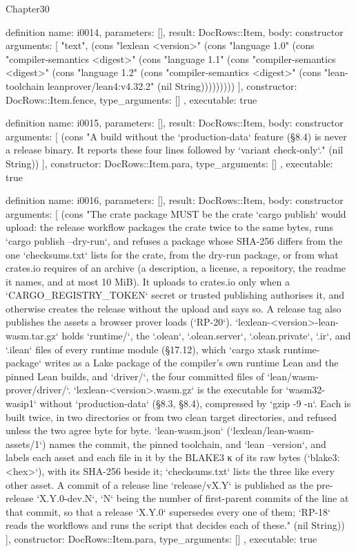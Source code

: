 \begin{lexlean}{Chapter30}
\begin{semanticmodule}
definition{
  name: i0014,
  parameters: [],
  result: DocRows::Item,
  body: constructor{
    arguments: [
      "text",
      (cons "lexlean <version>" (cons "language 1.0" (cons "compiler-semantics <digest>" (cons "language 1.1" (cons "compiler-semantics <digest>" (cons "language 1.2" (cons "compiler-semantics <digest>" (cons "lean-toolchain leanprover/lean4:v4.32.2" (nil String)))))))))
    ],
    constructor: DocRows::Item.fence,
    type_arguments: []
  },
  executable: true
}

definition{
  name: i0015,
  parameters: [],
  result: DocRows::Item,
  body: constructor{
    arguments: [
      (cons "A build without the `production-data` feature (§8.4) is never a release binary. It reports these four lines followed by `variant check-only`." (nil String))
    ],
    constructor: DocRows::Item.para,
    type_arguments: []
  },
  executable: true
}

definition{
  name: i0016,
  parameters: [],
  result: DocRows::Item,
  body: constructor{
    arguments: [
      (cons "The crate package MUST be the crate `cargo publish` would upload: the release workflow packages the crate twice to the same bytes, runs `cargo publish --dry-run`, and refuses a package whose SHA-256 differs from the one `checksums.txt` lists for the crate, from the dry-run package, or from what crates.io requires of an archive (a description, a license, a repository, the readme it names, and at most 10 MiB). It uploads to crates.io only when a `CARGO_REGISTRY_TOKEN` secret or trusted publishing authorises it, and otherwise creates the release without the upload and says so. A release tag also publishes the assets a browser prover loads (`RP-20`). `lexlean-<version>-lean-wasm.tar.gz` holds `runtime/`, the `.olean`, `.olean.server`, `.olean.private`, `.ir`, and `.ilean` files of every runtime module (§17.12), which `cargo xtask runtime-package` writes as a Lake package of the compiler's own runtime Lean and the pinned Lean builds, and `driver/`, the four committed files of `lean/wasm-prover/driver/`. `lexlean-<version>.wasm.gz` is the executable for `wasm32-wasip1` without `production-data` (§8.3, §8.4), compressed by `gzip -9 -n`. Each is built twice, in two directories or from two clean target directories, and refused unless the two agree byte for byte. `lean-wasm.json` (`lexlean/lean-wasm-assets/1`) names the commit, the pinned toolchain, and `lean --version`, and labels each asset and each file in it by the BLAKE3 κ of its raw bytes (`blake3:<hex>`), with its SHA-256 beside it; `checksums.txt` lists the three like every other asset. A commit of a release line `release/vX.Y` is published as the pre-release `X.Y.0-dev.N`, `N` being the number of first-parent commits of the line at that commit, so that a release `X.Y.0` supersedes every one of them; `RP-18` reads the workflows and runs the script that decides each of these." (nil String))
    ],
    constructor: DocRows::Item.para,
    type_arguments: []
  },
  executable: true
}


\end{semanticmodule}
\end{lexlean}
